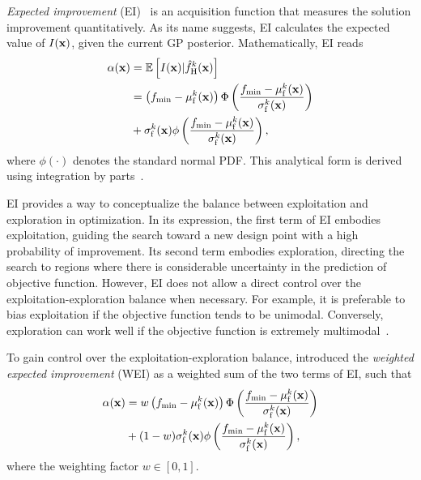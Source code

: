 \documentclass[iicol,sn-basic]{sn-jnl}%
\begin{document}
\textit{Expected improvement} (EI)~\citep{Mockus1975,Jones1998} is an acquisition function that measures the solution improvement quantitatively.
As its name suggests, EI calculates the expected value of $I({\bf x})$, given the current GP posterior.
Mathematically, EI reads
\begin{equation}\label{Eq42}
	\begin{aligned}
		\alpha({\bf x}) & = \mathbb{E}\left[I({\bf x})|\hat{f}_\text{H}^k({\bf x})\right]\\
		& =\left( f_\text{min}-\mu_\text{f}^k({\bf x})\right)\Phi\left(\frac{f_\text{min}-\mu_\text{f}^k({\bf x})}{\sigma_\text{f}^k({\bf x})}\right)\\
		&+\sigma_\text{f}^k({\bf x})\phi\left(\frac{f_\text{min}-\mu_\text{f}^k({\bf x})}{\sigma_\text{f}^k({\bf x})}\right),
	\end{aligned}
\end{equation}
where $\phi(\cdot)$ denotes the standard normal PDF.
This analytical form is derived using integration by parts~\citep{Jones1998,Kochenderfer2019}.

EI provides a way to conceptualize the balance between exploitation and exploration in optimization.
In its expression, the first term of EI embodies exploitation, guiding the search toward a new design point with a high probability of improvement.
Its second term embodies exploration, directing the search to regions where there is considerable uncertainty in the prediction of objective function.
However, EI does not allow a direct control over the exploitation-exploration balance when necessary.
For example, it is preferable to bias exploitation if the objective function tends to be unimodal.
Conversely, exploration can work well if the objective function is extremely multimodal~\citep{Sobester2005}.

To gain control over the exploitation-exploration balance, \cite{Sobester2005} introduced the \textit{weighted expected improvement} (WEI) as a weighted sum of the two terms of EI, such that
\begin{equation}\label{Eq43}
	\begin{aligned}
		\alpha({\bf x}) & = w\left( f_\text{min}-\mu_\text{f}^k({\bf x})\right)\Phi\left(\frac{f_\text{min}-\mu_\text{f}^k({\bf x})}{\sigma_\text{f}^k({\bf x})}\right)\\
		&+(1-w)\sigma_\text{f}^k({\bf x})\phi\left(\frac{f_\text{min}-\mu_\text{f}^k({\bf x})}{\sigma_\text{f}^k({\bf x})}\right),
	\end{aligned}
\end{equation}
where the weighting factor $w \in [0,1]$.
\end{document}
